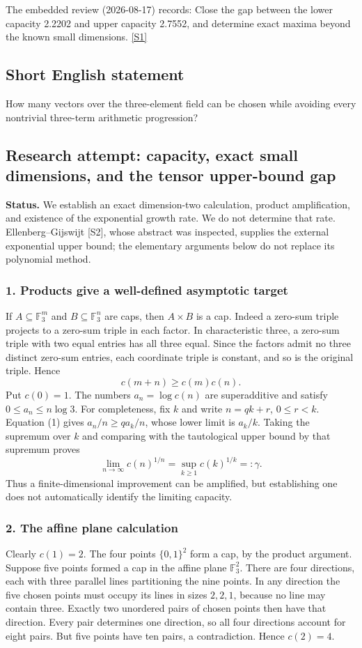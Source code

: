 \documentclass[11pt,a4paper]{article}
\newcommand{\sref}[2]{\hyperlink{source:#1:#2}{[S#2]}}
\begin{document}
The embedded review (2026-08-17) records: Close the gap between the lower capacity 2.2202 and upper capacity 2.7552, and determine exact maxima beyond the known small dimensions. \sref{statement}{1}

\subsection{Short English statement}

How many vectors over the three-element field can be chosen while avoiding every nontrivial three-term arithmetic progression?

\subsection{Research attempt: capacity, exact small dimensions, and the tensor upper-bound gap}
\textbf{Status.} We establish an exact dimension-two calculation, product amplification, and existence of the exponential growth rate. We do not determine that rate. Ellenberg--Gijswijt [S2], whose abstract was inspected, supplies the external exponential upper bound; the elementary arguments below do not replace its polynomial method.

\subsubsection{1. Products give a well-defined asymptotic target}
If $A\subseteq\mathbb F_3^m$ and $B\subseteq\mathbb F_3^n$ are caps, then $A\times B$ is a cap. Indeed a zero-sum triple projects to a zero-sum triple in each factor. In characteristic three, a zero-sum triple with two equal entries has all three equal. Since the factors admit no three distinct zero-sum entries, each coordinate triple is constant, and so is the original triple. Hence
\[c(m+n)\geq c(m)c(n).\tag{1}\]
Put $c(0)=1$. The numbers $a_n=\log c(n)$ are superadditive and satisfy $0\leq a_n\leq n\log3$. For completeness, fix $k$ and write $n=qk+r$, $0\leq r<k$. Equation (1) gives $a_n/n\geq q a_k/n$, whose lower limit is $a_k/k$. Taking the supremum over $k$ and comparing with the tautological upper bound by that supremum proves
\[\lim_{n\to\infty}c(n)^{1/n}
=\sup_{k\geq1}c(k)^{1/k}=:\gamma.\tag{2}\]
Thus a finite-dimensional improvement can be amplified, but establishing one does not automatically identify the limiting capacity.

\subsubsection{2. The affine plane calculation}
Clearly $c(1)=2$. The four points $\{0,1\}^2$ form a cap, by the product argument. Suppose five points formed a cap in the affine plane $\mathbb F_3^2$. There are four directions, each with three parallel lines partitioning the nine points. In any direction the five chosen points must occupy its lines in sizes $2,2,1$, because no line may contain three. Exactly two unordered pairs of chosen points then have that direction. Every pair determines one direction, so all four directions account for eight pairs. But five points have ten pairs, a contradiction. Hence $c(2)=4$.
\end{document}
